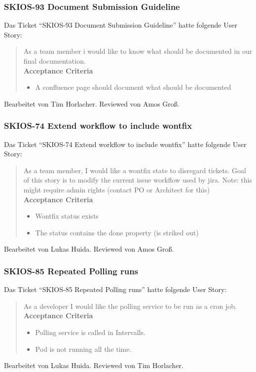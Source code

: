 \subsubsection{SKIOS-93 Document Submission Guideline}
Das Ticket \enquote{SKIOS-93 Document Submission Guideline} hatte folgende User Story:
\begin{quotation}
    As a team member i would like to know what should be documented in our final documentation. \\
    \textbf{Acceptance Criteria}
    \begin{itemize}
        \item A confluence page should document what should be documented
    \end{itemize}
\end{quotation}
Bearbeitet von Tim Horlacher.
Reviewed von Amos Groß.

\subsubsection{SKIOS-74 Extend workflow to include wontfix}
Das Ticket \enquote{SKIOS-74 Extend workflow to include wontfix} hatte folgende User Story:
\begin{quotation}
    As a team member, I would like a wontfix state to disregard tickets.
    Goal of this story is to modify the current issue workflow used by jira.
    Note: this might require admin rights (contact PO or Architect for this) \\
    \textbf{Acceptance Criteria}
    \begin{itemize}
        \item Wontfix status exists
        \item The status contains the done property (is striked out)
    \end{itemize}
\end{quotation}
Bearbeitet von Lukas Huida.
Reviewed von Amos Groß.

\subsubsection{SKIOS-85 Repeated Polling runs}
Das Ticket \enquote{SKIOS-85 Repeated Polling runs} hatte folgende User Story:
\begin{quotation}
    As a developer I would like the polling service to be run as a cron job. \\
    \textbf{Acceptance Criteria}
    \begin{itemize}
        \item Polling service is called in Intervalls.
        \item Pod is not running all the time.
    \end{itemize}
\end{quotation}
Bearbeitet von Lukas Huida.
Reviewed von Tim Horlacher.

